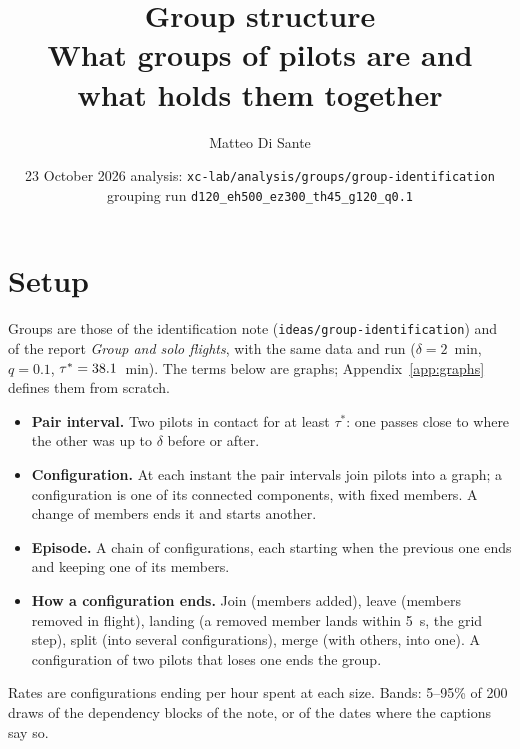 \documentclass[10pt,a4paper]{article}
\title{\textbf{Group structure}\\[2pt]
  \large What groups of pilots are and what holds them together}
\author{Matteo Di Sante}
\date{23 October 2026 \;\textbullet\; analysis: \texttt{xc-lab/analysis/groups/group-identification} \;\textbullet\;
  grouping run \texttt{d120\_eh500\_ez300\_th45\_g120\_q0.1}}
\begin{document}
\maketitle
\vspace{-14pt}



\section{Setup}\label{sec:setup}

Groups are those of the identification note (\texttt{ideas/group-identification}) and of the
report \emph{Group and solo flights}, with the same data and run ($\delta=2$~min, $q=0.1$,
$\tau^*=38.1$~min). The terms below are graphs; Appendix~\ref{app:graphs} defines them from
scratch.

\begin{itemize}
  \item \textbf{Pair interval.} Two pilots in contact for at least $\tau^*$: one passes close to
        where the other was up to $\delta$ before or after.
  \item \textbf{Configuration.} At each instant the pair intervals join pilots into a graph; a
        configuration is one of its connected components, with fixed members. A change of
        members ends it and starts another.
  \item \textbf{Episode.} A chain of configurations, each starting when the previous one ends
        and keeping one of its members.
  \item \textbf{How a configuration ends.} Join (members added), leave (members removed in
        flight), landing (a removed member lands within 5~s, the grid step), split (into
        several configurations), merge (with others, into one). A configuration of two pilots
        that loses one ends the group.
\end{itemize}

Rates are configurations ending per hour spent at each size. Bands: 5--95\% of 200 draws of the
dependency blocks of the note, or of the dates where the captions say so.








\end{document}
